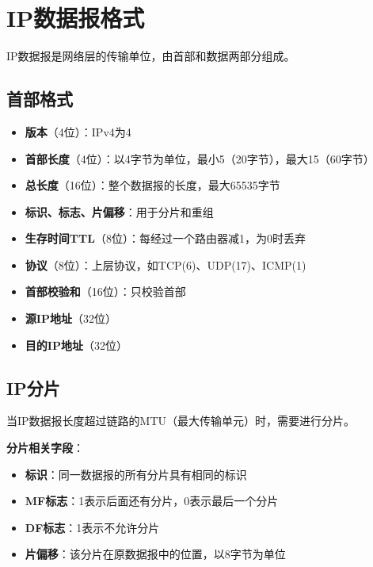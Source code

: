 \documentclass[12pt,a4paper,openany]{ctexbook}
\begin{document}
\section{IP数据报格式}
IP数据报是网络层的传输单位，由首部和数据两部分组成。

\subsection{首部格式}
\begin{itemize}[leftmargin=2em,itemsep=0pt]
    \item \textbf{版本}（4位）：IPv4为4
    \item \textbf{首部长度}（4位）：以4字节为单位，最小5（20字节），最大15（60字节）
    \item \textbf{总长度}（16位）：整个数据报的长度，最大65535字节
    \item \textbf{标识、标志、片偏移}：用于分片和重组
    \item \textbf{生存时间TTL}（8位）：每经过一个路由器减1，为0时丢弃
    \item \textbf{协议}（8位）：上层协议，如TCP(6)、UDP(17)、ICMP(1)
    \item \textbf{首部校验和}（16位）：只校验首部
    \item \textbf{源IP地址}（32位）
    \item \textbf{目的IP地址}（32位）
\end{itemize}

\subsection{IP分片}
当IP数据报长度超过链路的MTU（最大传输单元）时，需要进行分片。

\textbf{分片相关字段}：
\begin{itemize}[leftmargin=2em,itemsep=0pt]
    \item \textbf{标识}：同一数据报的所有分片具有相同的标识
    \item \textbf{MF标志}：1表示后面还有分片，0表示最后一个分片
    \item \textbf{DF标志}：1表示不允许分片
    \item \textbf{片偏移}：该分片在原数据报中的位置，以8字节为单位
\end{itemize}
\end{document}

